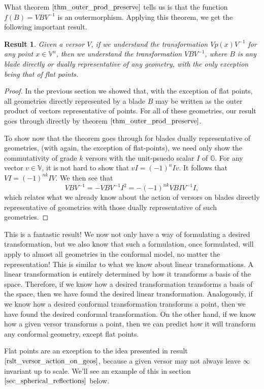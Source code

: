 \documentclass[12pt]{article}
\newcommand{\G}{\mathbb{G}}
\newcommand{\V}{\mathbb{V}}
\newcommand{\nvai}{\infty}
\newtheorem{result}{Result}[section]
\begin{document}
What theorem $\eqref{thm_outer_prod_preserve}$ tells us is that the function
$f(B)=VBV^{-1}$ is an outermorphism.  Applying this theorem, we get the following
important result.
\begin{result}\label{rslt_versor_action_on_geos}
Given a versor $V$, if we understand the transformation $Vp(x)V^{-1}$ for
any point $x\in\V^n$, then we understand the transformation $VBV^{-1}$,
where $B$ is any blade directly or dually representative of any geometry, with
the only exception being that of flat points.
\end{result}
\begin{proof}
In the previous section we showed that, with the exception of flat points,
all geometries directly represented by a blade $B$ may be written
as the outer product of vectors representative of points.  For all of
these geometries, our result goes through directly by theorem $\eqref{thm_outer_prod_preserve}$.

To show now that the theorem goes through for blades dually representative of geometries, (with again,
the exception of flat-points),
we need only show the commutativity of grade $k$ versors with the unit-psuedo scalar $I$ of $\G$.
For any vector $v\in\V$, it is not hard to show that $vI=(-1)^nIv$.  It follows that $VI=(-1)^{nk}IV$.
We then see that
\begin{equation*}
VBV^{-1} = -VBV^{-1}I^2 = -(-1)^{nk}VBIV^{-1}I,
\end{equation*}
which relates what we already know about the action of versors on blades directly
representative of geometries with those dually representative of such geometries.
\end{proof}
This is a fantastic result!  We now not only have a way of formulating a desired
transformation, but we also know that such a formulation, once formulated, will
apply to almost all geometries in the conformal model, no matter the representation!
This is similar to what we know about linear transformations.  A linear transformation
is entirely determined by how it transforms a basis of the space.  Therefore, if we
know how a desired transformation transforms a basis of the space, then we have
found the desired linear transformation.  Analogously, if we know how a desired
conformal transformation transforms a point, then we have found the desired
conformal transformation.  On the other hand, if we know how a given versor
transforms a point, then we can predict how it will transform any conformal
geometry, except flat points.

Flat points are an exception to the idea presented in result $\eqref{rslt_versor_action_on_geos}$,
because a given versor may not always leave $\nvai$ invariant up to scale.
We'll see an example of this in section $\eqref{sec_spherical_reflections}$ below.
\end{document}
